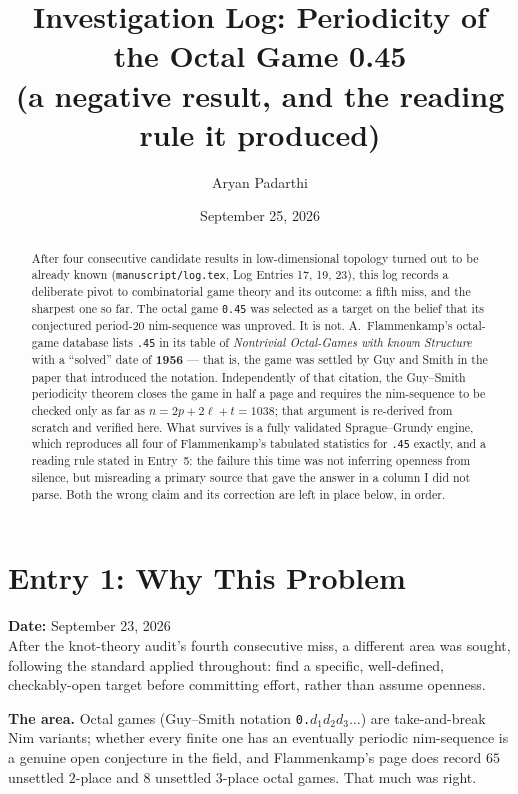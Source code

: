 \documentclass[12pt]{article}
\title{Investigation Log: Periodicity of the Octal Game 0.45\\
\large (a negative result, and the reading rule it produced)}
\author{Aryan Padarthi}
\date{September 25, 2026}
\begin{document}
\maketitle

\begin{abstract}
After four consecutive candidate results in low-dimensional topology turned
out to be already known (\texttt{manuscript/log.tex}, Log Entries 17, 19, 23),
this log records a deliberate pivot to combinatorial game theory and its
outcome: a fifth miss, and the sharpest one so far. The octal game
\texttt{0.45} was selected as a target on the belief that its conjectured
period-$20$ nim-sequence was unproved. It is not. A.~Flammenkamp's
octal-game database lists \texttt{.45} in its table of \emph{Nontrivial
Octal-Games with known Structure} with a ``solved'' date of \textbf{1956} ---
that is, the game was settled by Guy and Smith in the paper that introduced
the notation. Independently of that citation, the Guy--Smith periodicity
theorem closes the game in half a page and requires the nim-sequence to be
checked only as far as $n=2p+2\ell+t=1038$; that argument is re-derived from
scratch and verified here. What survives is a fully validated Sprague--Grundy
engine, which reproduces all four of Flammenkamp's tabulated statistics for
\texttt{.45} exactly, and a reading rule stated in Entry~5: the failure this
time was not inferring openness from silence, but misreading a primary source
that gave the answer in a column I did not parse. Both the wrong claim and its
correction are left in place below, in order.
\end{abstract}

\section*{Entry 1: Why This Problem}
\textbf{Date:} September 23, 2026 \\
After the knot-theory audit's fourth consecutive miss, a different area
was sought, following the standard applied throughout: find a specific,
well-defined, checkably-open target before committing effort, rather
than assume openness.

\textbf{The area.} Octal games (Guy--Smith notation \texttt{0.}$d_1d_2d_3\ldots$)
are take-and-break Nim variants; whether every finite one has an eventually
periodic nim-sequence is a genuine open conjecture in the field, and
Flammenkamp's page does record $65$ unsettled $2$-place and $8$ unsettled
$3$-place octal games. That much was right.
\end{document}
